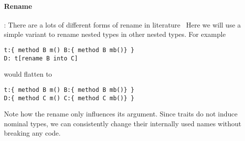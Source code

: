 \paragraph{Rename}:
There are a lots of different forms of rename in
literature~\cite{deep,ancona2002calculus,bracha1992programming}
Here we will use a simple variant to rename nested types in other nested types.
For example 
\begin{lstlisting}
t:{ method B m() B:{ method B mb()} }
D: t[rename B into C]
\end{lstlisting}
would flatten to 
\begin{lstlisting}
t:{ method B m() B:{ method B mb()} }
D:{ method C m() C:{ method C mb()} }
\end{lstlisting}
Note how the rename only influences its argument.
Since traits do not induce nominal types, we can
consistently change their
internally used names without breaking any code.

%
%
% 
%



